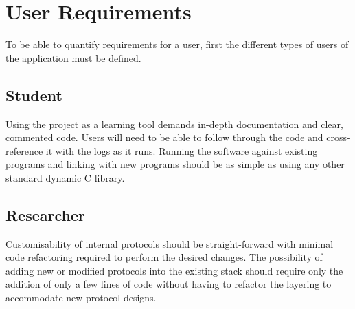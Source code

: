     \section{User Requirements}
    To be able to quantify requirements for a user, first the different types of users of the application must be defined.

        \subsection{Student}
        Using the project as a learning tool demands in-depth documentation and clear, commented code. Users will need to be able to follow through the code and cross-reference it with the logs as it runs. Running the software against existing programs and linking with new programs should be as simple as using any other standard dynamic C library.

        \subsection{Researcher}
        Customisability of internal protocols should be straight-forward with minimal code refactoring required to perform the desired changes. The possibility of adding new or modified protocols into the existing stack should require only the addition of only a few lines of code without having to refactor the layering to accommodate new protocol designs.

